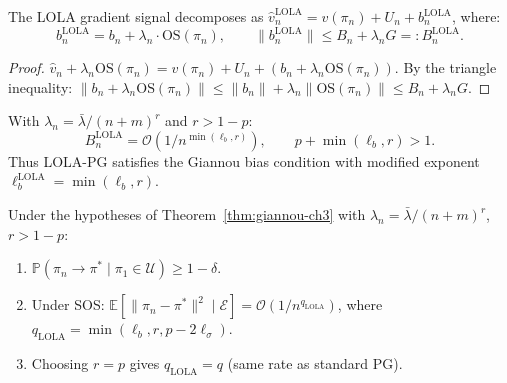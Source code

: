 \begin{lemma}
\label{lem:bias-absorption-ch3}
The LOLA gradient signal decomposes as $\hat{v}_n^{\mathrm{LOLA}} = v(\pi_n) + U_n + b_n^{\mathrm{LOLA}}$, where:
\begin{equation}
\label{eq:lola-bias}
    b_n^{\mathrm{LOLA}} = b_n + \lambda_n \cdot \mathrm{OS}(\pi_n), \qquad \|b_n^{\mathrm{LOLA}}\| \leq B_n + \lambda_n G =: B_n^{\mathrm{LOLA}}.
\end{equation}
\end{lemma}

\begin{proof}
$\hat{v}_n + \lambda_n \mathrm{OS}(\pi_n) = v(\pi_n) + U_n + (b_n + \lambda_n \mathrm{OS}(\pi_n))$. By the triangle inequality: $\|b_n + \lambda_n \mathrm{OS}(\pi_n)\| \leq \|b_n\| + \lambda_n \|\mathrm{OS}(\pi_n)\| \leq B_n + \lambda_n G$.
\end{proof}

\begin{lemma}
\label{lem:schedule-ch3}
With $\lambda_n = \bar{\lambda}/(n+m)^r$ and $r > 1 - p$:
\begin{equation}
    B_n^{\mathrm{LOLA}} = \mathcal{O}(1/n^{\min(\ell_b, r)}), \qquad p + \min(\ell_b, r) > 1.
\end{equation}
Thus LOLA-PG satisfies the Giannou bias condition with modified exponent $\ell_b^{\mathrm{LOLA}} = \min(\ell_b, r)$.
\end{lemma}

\begin{theorem}
\label{thm:annealed-ch3}
Under the hypotheses of Theorem~\ref{thm:giannou-ch3} with $\lambda_n = \bar{\lambda}/(n+m)^r$, $r > 1 - p$:
\begin{enumerate}
    \item $\mathbb{P}(\pi_n \to \pi^* \mid \pi_1 \in \mathcal{U}) \geq 1 - \delta$.
    \item Under SOS: $\mathbb{E}[\|\pi_n - \pi^*\|^2 \mid \mathcal{E}] = \mathcal{O}(1/n^{q_{\mathrm{LOLA}}})$, where $q_{\mathrm{LOLA}} = \min(\ell_b, r, p - 2\ell_\sigma)$.
    \item Choosing $r = p$ gives $q_{\mathrm{LOLA}} = q$ (same rate as standard PG).
\end{enumerate}
\end{theorem}


